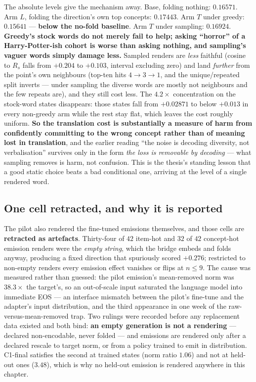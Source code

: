 \documentclass[11pt]{article}
\begin{document}
The absolute levels give the mechanism away. Base, folding nothing: $0.16571$. Arm $L$, folding the
direction's own top concepts: $0.17443$. Arm $T$ under greedy: $\mathbf{0.15641}$ --- \textbf{below
the no-fold baseline}. Arm $T$ under sampling: $0.16924$. \textbf{Greedy's stock words do not merely
fail to help; asking ``horror'' of a Harry-Potter-ish cohort is worse than asking nothing, and
sampling's vaguer words simply damage less.} Sampled renders are \emph{less} faithful (cosine to
$R_s$ falls from $+0.204$ to $+0.103$, interval excluding zero) and land \emph{further} from the
point's own neighbours (top-ten hits $4 \to 3 \to 1$, and the unique/repeated split inverts --- under
sampling the diverse words are mostly not neighbours and the few repeats are), and they still cost
less. The $4.2\times$ concentration on the stock-word states disappears: those states fall from
$+0.02871$ to below $+0.013$ in every non-greedy arm while the rest stay flat, which leaves the cost
roughly uniform. \textbf{So the translation cost is substantially a measure of harm from confidently
committing to the wrong concept rather than of meaning lost in translation}, and the earlier reading
``the noise is decoding diversity, not verbalisation'' survives only in the form \emph{the loss is
removable by decoding} --- what sampling removes is harm, not confusion. This is the thesis's
standing lesson that a good static choice beats a bad conditional one, arriving at the level of a
single rendered word.

\subsection{One cell retracted, and why it is reported}

The pilot also rendered the fine-tuned emissions themselves, and those cells are \textbf{retracted as
artefacts}. Thirty-four of $42$ item-hot and $32$ of $42$ concept-hot emission renders were the
\emph{empty string}, which the bridge embeds and folds anyway, producing a fixed direction that
spuriously scored $+0.276$; restricted to non-empty renders every emission effect vanishes or flips
at $n \le 9$. The cause was measured rather than guessed: the pilot emission's mean-removed norm was
$38.3\times$ the target's, so an out-of-scale input saturated the language model into immediate EOS
--- an interface mismatch between the pilot's fine-tune and the adapter's input distribution, and the
third appearance in one week of the raw-versus-mean-removed trap. Two rulings were recorded before
any replacement data existed and both bind: \textbf{an empty generation is not a rendering} ---
declared non-encodable, never folded --- and emissions are rendered only after a declared rescale to
target norm, or from a policy trained to emit in distribution. C1-final satisfies the second at
trained states (norm ratio $1.06$) and not at held-out ones ($3.48$), which is why no held-out
emission is rendered anywhere in this chapter.
\end{document}
